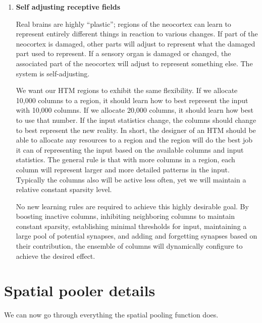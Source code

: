 \documentclass{report}
\begin{document}
\begin{enumerate}
\item {\bf Self adjusting receptive fields}

Real brains are highly ``plastic''; regions of the neocortex can learn
to represent entirely different things in reaction to various
changes. If part of the neocortex is damaged, other parts will adjust
to represent what the damaged part used to represent. If a sensory
organ is damaged or changed, the associated part of the neocortex will
adjust to represent something else. The system is self-adjusting.

We want our HTM regions to exhibit the same flexibility. If we
allocate 10,000 columns to a region, it should learn how to best
represent the input with 10,000 columns. If we allocate 20,000
columns, it should learn how best to use that number. If the input
statistics change, the columns should change to best represent the new
reality. In short, the designer of an HTM should be able to allocate
any resources to a region and the region will do the best job it can
of representing the input based on the available columns and input
statistics. The general rule is that with more columns in a region,
each column will represent larger and more detailed patterns in the
input. Typically the columns also will be active less often, yet we
will maintain a relative constant sparsity level.

No new learning rules are required to achieve this highly desirable
goal. By boosting inactive columns, inhibiting neighboring columns to
maintain constant sparsity, establishing minimal thresholds for input,
maintaining a large pool of potential synapses, and adding and
forgetting synapses based on their contribution, the ensemble of
columns will dynamically configure to achieve the desired effect.
\end{enumerate}

\section*{Spatial pooler details}

We can now go through everything the spatial pooling function does.
\end{document}

